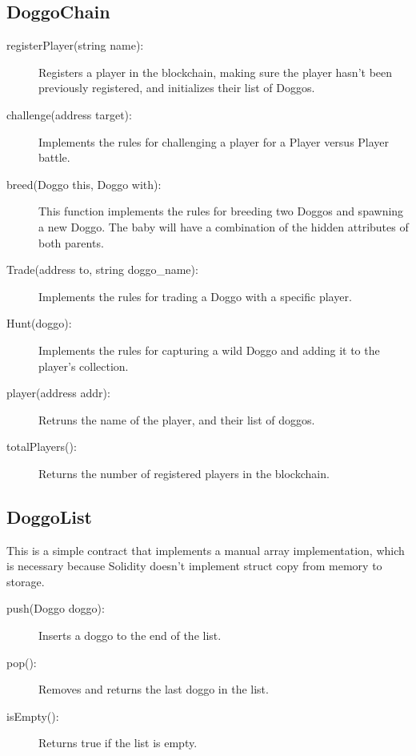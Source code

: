 \documentclass{article}
\begin{document}
    \subsection{DoggoChain}
    \begin{description}
        \item[registerPlayer(string name):] Registers a player in the blockchain, making
        sure the player hasn't been previously registered, and initializes
        their list of Doggos.
        \item[challenge(address target):] Implements the rules for challenging a player
        for a Player versus Player battle.
        \item[breed(Doggo this, Doggo with):] This function implements the rules
        for breeding two Doggos and spawning a new Doggo. The baby will have a 
        combination of the hidden attributes of both parents.
        \item[Trade(address to, string doggo\_name):] Implements the rules for 
        trading a Doggo with a specific player. 
        \item[Hunt(doggo):] Implements the rules for capturing a wild Doggo and
        adding it to the player's collection.
        \item[player(address addr):] Retruns the name of the player, and their
        list of doggos.
        \item[totalPlayers():] Returns the number of registered players in the 
        blockchain.      
    \end{description}

    \subsection{DoggoList}
    This is a simple contract that implements a manual array implementation,
    which is necessary because Solidity doesn't implement struct copy from
    memory to storage. 
    \begin{description}
        \item[push(Doggo doggo):] Inserts a doggo to the end of the list.
        \item[pop():] Removes and returns the last doggo in the list. 
        \item[isEmpty():] Returns true if the list is empty. 
    \end{description}
\end{document}
